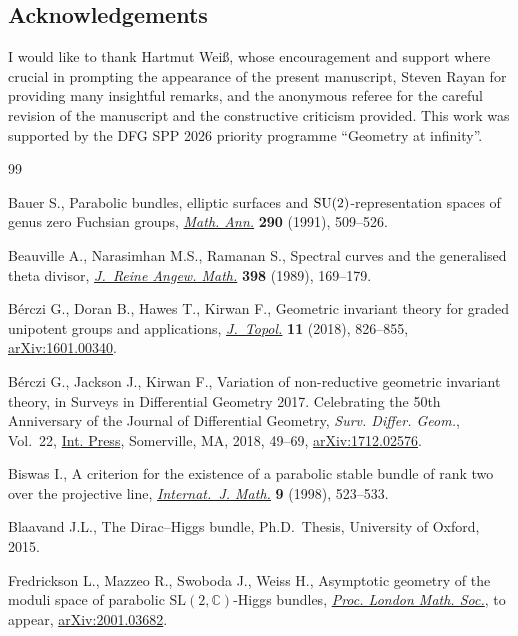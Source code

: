 \documentclass[pdftex]{sigma}
\numberwithin{equation}{section}
\begin{document}
\subsection*{Acknowledgements}

I would like to thank Hartmut Wei\ss, whose encouragement and support where crucial in promp\-ting the appearance of the present manuscript, Steven Rayan for providing many insightful remarks, and the anonymous referee for the careful revision of the manuscript and the constructive criticism provided. This work was supported by the DFG SPP 2026 priority programme ``Geometry at infinity''.

\begin{thebibliography}{99}
\footnotesize\itemsep=0pt

Bauer S., Parabolic bundles, elliptic surfaces and {${\rm
 SU}(2)$}-representation spaces of genus zero {F}uchsian groups, \href{https://doi.org/10.1007/BF01459257}{\textit{Math.
 Ann.}} \textbf{290} (1991), 509--526.

Beauville A., Narasimhan M.S., Ramanan S., Spectral curves and the generalised
 theta divisor, \href{https://doi.org/10.1515/crll.1989.398.169}{\textit{J.~Reine Angew. Math.}} \textbf{398} (1989), 169--179.

B\'erczi G., Doran B., Hawes T., Kirwan F., Geometric invariant theory for
 graded unipotent groups and applications, \href{https://doi.org/10.1112/topo.12075}{\textit{J.~Topol.}} \textbf{11}
 (2018), 826--855, \href{https://arxiv.org/abs/1601.00340}{arXiv:1601.00340}.

B\'erczi G., Jackson J., Kirwan F., Variation of non-reductive geometric
 invariant theory, in Surveys in Differential Geometry 2017. {C}elebrating the
 50th Anniversary of the {J}ournal of {D}ifferential {G}eometry, \textit{Surv.
 Differ. Geom.}, Vol.~22, \href{https://doi.org/10.4310/SDG.2017.v22.n1.a2}{Int. Press}, Somerville, MA, 2018, 49--69,
 \href{https://arxiv.org/abs/1712.02576}{arXiv:1712.02576}.

Biswas I., A criterion for the existence of a parabolic stable bundle of rank
 two over the projective line, \href{https://doi.org/10.1142/S0129167X98000233}{\textit{Internat.~J. Math.}} \textbf{9} (1998),
 523--533.

Blaavand J.L., The {D}irac--{H}iggs bundle, Ph.D.~Thesis, {U}niversity of
 Oxford, 2015.

Fredrickson L., Mazzeo R., Swoboda J., Weiss H., Asymptotic geometry of the
 moduli space of parabolic $\mathrm{SL}(2,\mathbb{C})$-{H}iggs bundles,
 \href{https://doi.org/10.1112/jlms.12581}{\textit{Proc. London Math. Soc.}}, {t}o appear, \href{https://arxiv.org/abs/2001.03682}{arXiv:2001.03682}.


\end{thebibliography}
\end{document}
